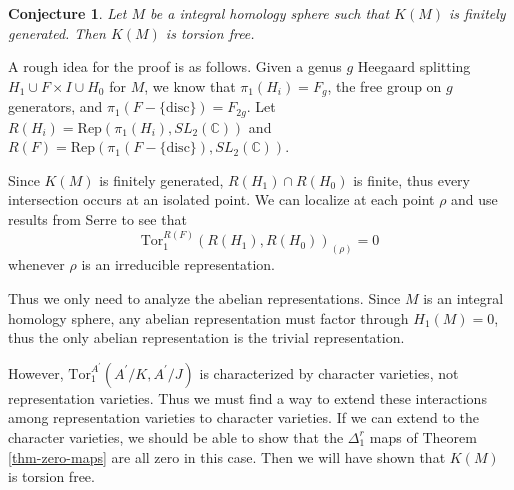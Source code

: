 \documentclass{slides}
\newcommand{\slc}{SL_2(\mathbb{C})}
\newtheorem{conjecture}{Conjecture}
\begin{document}
\begin{slide}
\begin{conjecture}
Let $M$ be a integral homology sphere such that $K(M)$ is
finitely generated.  Then $K(M)$ is torsion free.
\label{conjecture}
\end{conjecture}

A rough idea for the proof is as follows.
Given a genus $g$ Heegaard splitting $H_1 \cup F \times I \cup H_0$ for
$M$, we know that $\pi_1(H_i) = F_g$, the free group on $g$ generators,
and $\pi_1(F - \{ \mathrm{disc} \} ) = F_{2g}$.  Let
$R(H_i) = \mathrm{Rep}(\pi_1(H_i), \slc )$ and
$R(F) = \mathrm{Rep}(\pi_1(F - \{ \mathrm{disc} \} ), \slc )$.

Since $K(M)$ is finitely generated, $R(H_1) \cap R(H_0)$ is finite, thus
every intersection occurs at an isolated point.  We can localize at each
point $\rho$ and use results from Serre to see that
$$\mathrm{Tor}_1^{R(F)} ( R(H_1), R(H_0))_{(\rho)} = 0$$ whenever
$\rho$ is an irreducible representation.
\end{slide}

\begin{slide}
Thus we only need to analyze
the abelian representations.  Since $M$ is an integral homology
sphere, any abelian representation must factor through $H_1(M) = 0$,
thus the only abelian representation is the trivial representation.

However, $\mathrm{Tor}_1^{A^{\prime}} ( A^{\prime} / K , A^{\prime} / J )$ is
characterized by character varieties, not representation varieties.  Thus we must
find a way to extend these interactions among representation varieties to
character varieties.
If we can extend to the character varieties, we should be able to show that the
$\Delta^r_1$ maps of Theorem \ref{thm-zero-maps} are all zero in this case.
Then we will have shown that $K(M)$ is torsion free.
\end{slide}
\end{document}
